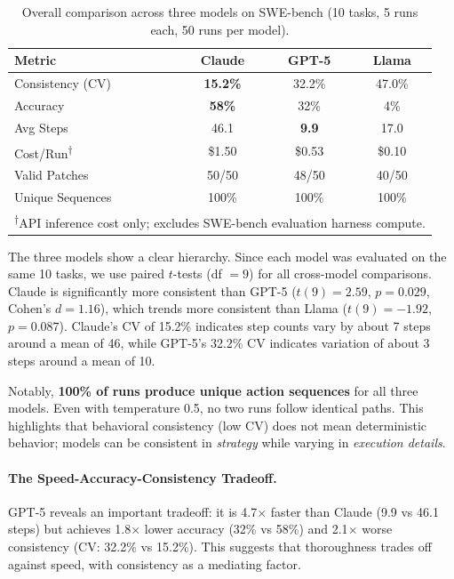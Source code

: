 \documentclass{article}
\begin{document}
\begin{table}[t]
\caption{Overall comparison across three models on SWE-bench (10 tasks, 5 runs each, 50 runs per model).}
\label{tab:main_results}
\vskip 0.15in
\begin{center}
\begin{small}
\begin{tabular}{lccc}
\toprule
Metric & Claude & GPT-5 & Llama \\
\midrule
Consistency (CV) & \textbf{15.2\%} & 32.2\% & 47.0\% \\
Accuracy & \textbf{58\%} & 32\% & 4\% \\
Avg Steps & 46.1 & \textbf{9.9} & 17.0 \\
Cost/Run\textsuperscript{$\dagger$} & \$1.50 & \$0.53 & \$0.10 \\
Valid Patches & 50/50 & 48/50 & 40/50 \\
Unique Sequences & 100\% & 100\% & 100\% \\
\bottomrule
\multicolumn{4}{l}{\textsuperscript{$\dagger$}\scriptsize API inference cost only; excludes SWE-bench evaluation harness compute.}
\end{tabular}
\end{small}
\end{center}
\vskip -0.1in
\end{table}

The three models show a clear hierarchy. Since each model was evaluated on the same 10 tasks, we use paired $t$-tests (df $= 9$) for all cross-model comparisons. Claude is significantly more consistent than GPT-5 ($t(9) = 2.59$, $p = 0.029$, Cohen's $d = 1.16$), which trends more consistent than Llama ($t(9) = -1.92$, $p = 0.087$). Claude's CV of 15.2\% indicates step counts vary by about 7 steps around a mean of 46, while GPT-5's 32.2\% CV indicates variation of about 3 steps around a mean of 10.

Notably, \textbf{100\% of runs produce unique action sequences} for all three models. Even with temperature 0.5, no two runs follow identical paths. This highlights that behavioral consistency (low CV) does not mean deterministic behavior; models can be consistent in \textit{strategy} while varying in \textit{execution details}.

\paragraph{The Speed-Accuracy-Consistency Tradeoff.} GPT-5 reveals an important tradeoff: it is 4.7$\times$ faster than Claude (9.9 vs 46.1 steps) but achieves 1.8$\times$ lower accuracy (32\% vs 58\%) and 2.1$\times$ worse consistency (CV: 32.2\% vs 15.2\%). This suggests that thoroughness trades off against speed, with consistency as a mediating factor.
\end{document}
